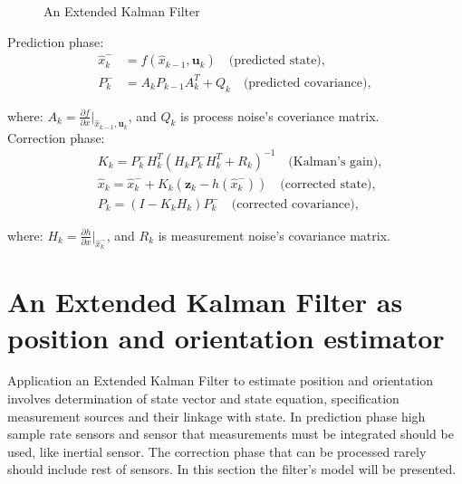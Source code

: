 \begin{figure}[!h]
	\centering
	\caption{An Extended Kalman Filter}
	\label{kf_diagram}
\end{figure}

Prediction phase:
\[
\begin{aligned}
	\hat{x}_k^- & = f(\hat{x}_{k-1}, \bm{u}_k) \quad \text{(predicted state)}, \\
	P_k^- & = A_k P_{k-1} A_k^T + Q_k \quad \text{(predicted covariance)},
\end{aligned}
\]

where: $A_k = \frac{\partial f}{\partial x}\Bigr|_{\hat{x}_{k-1}, \bm{u}_k}$, and $Q_k$ is process noise's coveriance matrix.\\

Correction phase:
\[
\begin{aligned}
	&K_k = P_k^- H_k^T (H_k P_k^- H_k^T + R_k)^{-1} \quad \text{(Kalman's gain)}, \\
	&\hat{x}_k = \hat{x}_k^- + K_k(\bm{z}_k - h(\hat{x}_k^-)) \quad \text{(corrected state)}, \\
	&P_k = (I - K_k H_k) P_k^- \quad \text{(corrected covariance)},
\end{aligned}
\]

where: $H_k = \frac{\partial h}{\partial x}\Bigr|_{\hat{x}_k^-}$, and $R_k$ is measurement noise's covariance matrix.



\section{An Extended Kalman Filter as position and orientation estimator}

Application an Extended Kalman Filter to estimate position and orientation involves determination of state vector and state equation, specification measurement sources and their linkage with state. In prediction phase high sample rate sensors and sensor that measurements must be integrated should be used, like inertial sensor. The correction phase that can be processed rarely should include rest of sensors. In this section the filter's model will be presented.\\

